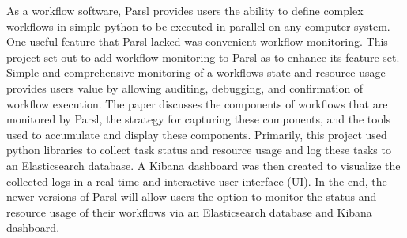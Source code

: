 As a workflow software, Parsl provides users the ability to define complex workflows in simple python to be executed in parallel on any computer system.
One useful feature that Parsl lacked was convenient workflow monitoring.
This project set out to add workflow monitoring to Parsl as to enhance its feature set.
Simple and comprehensive monitoring of a workflows state and resource usage provides users value by allowing auditing, debugging, and confirmation of workflow execution.
The paper discusses the components of workflows that are monitored by Parsl, the strategy for capturing these components, and the tools used to accumulate and display these components.
Primarily, this project used python libraries to collect task status and resource usage and log these tasks to an Elasticsearch database.
A Kibana dashboard was then created to visualize the collected logs in a real time and interactive user interface (UI).
In the end, the newer versions of Parsl will allow users the option to monitor the status and resource usage of their workflows via an Elasticsearch database and Kibana dashboard.
